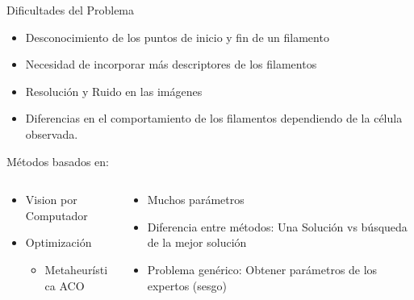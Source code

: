 \documentclass[]{beamer}
\begin{document}
\begin{frame}{Dificultades del Problema}
    \begin{itemize}
        \item Desconocimiento de los puntos de inicio y fin de un filamento
        \item Necesidad de incorporar m\'as descriptores de los filamentos
        \item Resoluci\'on y Ruido en las im\'agenes
        \item Diferencias en el comportamiento de los filamentos dependiendo de la c\'elula observada.
    \end{itemize}
\end{frame}


\begin{frame}{M\'etodos basados en:}
      \begin{columns}
    \begin{column}{0.4\textwidth}
         \begin{itemize}
        \item Vision por Computador
        \item Optimizaci\'on
        \begin{itemize}
            \item Metaheur\'istica ACO
        \end{itemize}
    \end{itemize}
    \end{column}
    \begin{column}{0.6\textwidth}
      \begin{itemize}
          \item Muchos par\'ametros
          \item Diferencia entre m\'etodos: Una Soluci\'on vs b\'usqueda de la mejor soluci\'on
          \item Problema gen\'erico: Obtener par\'ametros de los expertos (sesgo)
      \end{itemize}
    \end{column}
\end{columns}
\end{frame}
\end{document}
